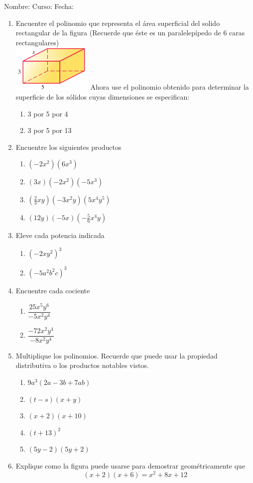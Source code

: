 \documentclass[letterpaper,fleqn]{article}
\newcommand{\LineaNombre}{%
\par
\vspace{\baselineskip}
Nombre:\hrulefill \; Curso: \underline{\hspace*{48pt}} \; Fecha: \underline{\hspace*{2.5cm}} \relax
\par}
\begin{document}
\LineaNombre
\begin{enumerate}
 \item Encuentre el polinomio que representa el área superficial del solido rectangular de la figura (Recuerde que \'{e}ste es un paralelep\'{i}pedo de 6 caras rectangulares)\\
\includegraphics[scale=1]{Images/solido01.png} 
\noanswer
Ahora use el polinomio obtenido para determinar la superficie de los sólidos cuyas dimensiones se especifican:
\begin{enumerate}
\item 3 por 5 por 4\noanswer
\item 3 por 5 por 13\noanswer
\end{enumerate}
\item Encuentre los siguientes productos
\begin{enumerate}
\item $(-2x^{2})(6x^{3})$\noanswer
\item $(3x)(-2x^{2})(-5x^{3})$\noanswer
\item $(\frac{2}{3}xy)(-3x^{2}y)(5x^{4}y^{5})$\noanswer
\item $(12y)(-5x)(-\frac{5}{6}x^{4}y)$\noanswer
\end{enumerate}
\item Eleve cada potencia indicada
\begin{enumerate}
\item $(-2xy^{2})^{3}$\noanswer
\item $(-5a^{2}b^{2}c)^{3}$\noanswer
\end{enumerate}
\newpage
\item Encuentre cada cociente
\begin{enumerate}
\item $\dfrac{25x^{5}y^{6}}{-5x^{2}y^{4}}$\noanswer
\item $\dfrac{-72x^{2}y^{4}}{-8x^{2}y^{4}}$\noanswer
\end{enumerate}
\item Multiplique los polinomios. Recuerde que puede usar la propiedad distributiva o los productos notables vistos.
\begin{enumerate}
\item $9a^{3}(2a-3b+7ab)$\noanswer
\item $(t-s)(x+y)$\noanswer
\item $(x+2)(x+10)$\noanswer
\item $(t+13)^{2}$\noanswer
\item $(5y-2)(5y+2)$\noanswer
\end{enumerate}
\item Explique como la figura puede usarse para demostrar geométricamente que \[(x+2)(x+6)=x^{2}+8x+12\]


\end{enumerate}
\end{document}
